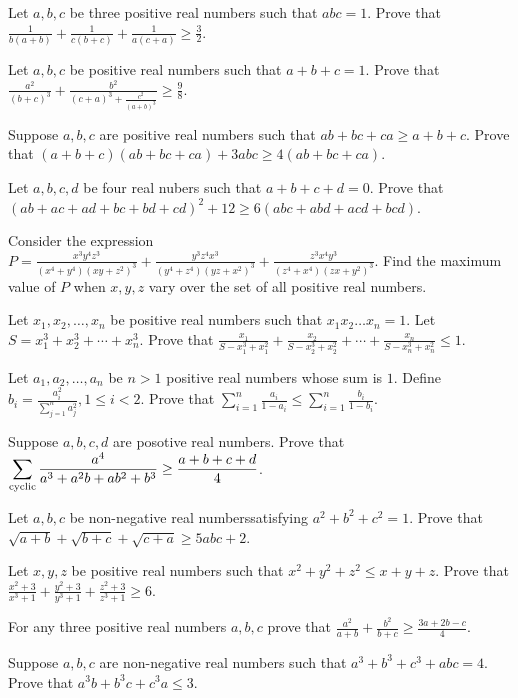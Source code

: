 \item Let $a, b, c$ be three positive real numbers such that $abc = 1$. Prove that $\frac{1}{b(a + b)} + \frac{1}{c(b + c)} +
  \frac{1}{a(c + a)}\geq \frac{3}{2}$.
\item Let $a, b, c$ be positive real numbers such that $a + b + c = 1$. Prove that $\frac{a^2}{(b + c)^3} + \frac{b^2}{(c + a)^3 +
  \frac{c^2}{(a + b)^3}}\geq \frac{9}{8}$.
\item Suppose $a, b, c$ are positive real numbers such that $ab + bc + ca\geq a + b + c$. Prove that $(a + b + c)(ab + bc + ca) +
  3abc \geq 4(ab + bc + ca)$.
\item Let $a, b, c, d$ be four real nubers such that $a + b + c + d = 0$. Prove that $(ab + ac + ad + bc + bd + cd)^2 + 12\geq
  6(abc + abd + acd + bcd)$.
\item Consider the expression $P = \frac{x^3y^4z^3}{(x^4 + y^4)(xy + z^2)^3} + \frac{y^3z^4x^3}{(y^4 + z^4)(yz + x^2)^3} +
  \frac{z^3x^4y^3}{(z^4 + x^4)(zx + y^2)^3}$. Find the maximum value of $P$ when $x, y, z$ vary over the set of all positive real
  numbers.
\item Let $x_1, x_2, \ldots, x_n$ be positive real numbers such that $x_1x_2\ldots x_n = 1$. Let $S = x_1^3 + x_2^3 + \cdots +
  x_n^3$. Prove that $\frac{x_1}{S - x_1^3 + x_1^2} + \frac{x_2}{S - x_2^3 + x_2^2} + \cdots + \frac{x_n}{S - x_n^3 + x_n^2}\leq
  1$.
\item Let $a_1, a_2, \ldots, a_n$ be $n > 1$ positive real numbers whose sum is $1$. Define $\displaystyle b_i =
  \frac{a_i^2}{\sum_{j = 1}^na_j^2}, 1\leq i< 2$. Prove that $\displaystyle\sum_{i = 1}^n\frac{a_i}{1 - a_i}\leq \sum_{i =
    1}^n\frac{b_i}{1 - b_i}$.
\item Suppose $a, b, c, d$ are posotive real numbers. Prove that $\displaystyle\sum_{\rm cyclic}\frac{a^4}{a^3 + a^2b + ab^2 +
  b^3}\geq \frac{a + b + c + d}{4}$.
\item Let $a, b, c$ be non-negative real numberssatisfying $a^2 + b^2 + c^2 = 1$. Prove that $\sqrt{a + b} + \sqrt{b + c} + \sqrt{c
  + a}\geq 5abc + 2$.
\item Let $x, y, z$ be positive real numbers such that $x^2 + y^2 + z^2\leq x + y + z$. Prove that $\frac{x^2 + 3}{x^3 + 1} +
  \frac{y^2 + 3}{y^3 + 1} + \frac{z^2 + 3}{z^3 + 1}\geq 6$.
\item For any three positive real numbers $a, b, c$ prove that $\frac{a^2}{a + b} + \frac{b^2}{b + c}\geq \frac{3a + 2b - c}{4}$.
\item Suppose $a, b, c$ are non-negative real numbers such that $a^3 + b^3 + c^3 + abc = 4$. Prove that $a^3b + b^3c + c^3a\leq 3$.
